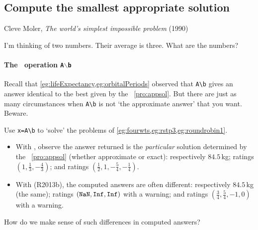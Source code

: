 \subsection{Compute the smallest appropriate solution}
\label{sec:csap}

\begin{quoted}{\parbox[t]{0.5\linewidth}{Cleve Moler, \emph{The world's simplest impossible problem} (1990)}}
I'm thinking of two numbers.  Their average is three.  What are the numbers?
\end{quoted}

\begin{comment}
Chapter~20 of the book by \cite{Higham1996} has some aspects of this section (including pseudo-inverse).
Matlab and Octave currently differ in that octave returns the smallest solution, but matlab returns a solution with at least \(m\)~nonzero elements??
\end{comment}

\paragraph{The \script\ operation \texttt{A$\backslash$b}}
Recall that \cref{eg:lifeExpectancy,eg:orbitalPeriods} observed that \verb|A\b| gives an answer identical to the best  given by the \svd\ \cref{pro:appsol}.
But there are just as many circumstances when \verb|A\b| is not `the approximate answer' that you want.
Beware.


\begin{example} 
Use \verb|x=A\b| to `solve' the problems of \cref{eg:fourwts,eg:rstp3,eg:roundrobin1}.
\begin{itemize}
\item With \script[2], observe the answer returned is the \emph{particular} solution determined by the \svd\ \cref{pro:appsol} (whether approximate or exact): 
respectively \(84.5\)\,kg; 
ratings \((1,\frac13,-\frac43)\); and 
ratings \((\frac12,1,-\frac54,-\frac14)\). %
\item With \script[1] (R2013b), the computed answers are often different: 
respectively \(84.5\)\,kg (the same); 
ratings \((\verb|NaN|,\verb|Inf|,\verb|Inf|)\) with a warning; 
and ratings \((\tfrac34,\tfrac54,-1,0)\) with a warning. %
\end{itemize}
How do we make sense of such differences in computed answers?
\end{example}

